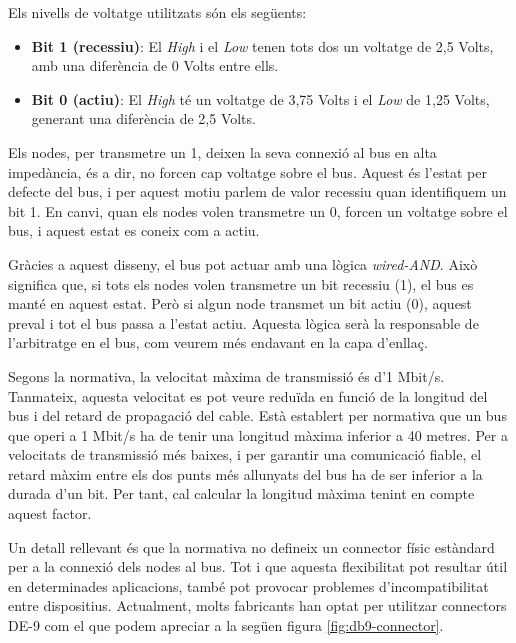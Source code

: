 \documentclass{tfgitic}[2024/07/01]
\begin{document}
Els nivells de voltatge utilitzats són els següents:

\begin{itemize}
  \item \textbf{Bit 1 (recessiu)}: El  \textit{High} i el  \textit{Low} tenen tots dos un voltatge de 2,5 Volts, amb una diferència de 0 Volts entre ells.

  \item \textbf{Bit 0 (actiu)}: El  \textit{High} té un voltatge de 3,75 Volts i el  \textit{Low} de 1,25 Volts, generant una diferència de 2,5 Volts.
\end{itemize} 

Els nodes, per transmetre un 1, deixen la seva connexió al bus en alta impedància, és a dir, no forcen cap voltatge sobre el bus. Aquest és l'estat per defecte del bus, 
i per aquest motiu parlem de valor recessiu quan identifiquem un bit 1. En canvi, quan els nodes volen transmetre un 0, forcen un voltatge sobre el bus, i aquest estat es 
coneix com a actiu.

Gràcies a aquest disseny, el bus pot actuar amb una lògica \textit{wired-AND}. Això significa que, si tots els nodes volen transmetre un bit recessiu (1), el bus es manté en aquest 
estat. Però si algun node transmet un bit actiu (0), aquest preval i tot el bus passa a l'estat actiu. Aquesta lògica serà la responsable de l'arbitratge en el bus, com veurem 
més endavant en la capa d'enllaç.

Segons la normativa, la velocitat màxima de transmissió és d'1 Mbit/s. Tanmateix, aquesta velocitat es pot veure reduïda en funció de la longitud del bus i del retard de 
propagació del cable. Està establert per normativa que un bus que operi a 1 Mbit/s ha de tenir una longitud màxima inferior a 40 metres. Per a velocitats de transmissió 
més baixes, i per garantir una comunicació fiable, el retard màxim entre els dos punts més allunyats del bus ha de ser inferior a la durada d'un bit. Per tant, cal calcular 
la longitud màxima tenint en compte aquest factor.

Un detall rellevant és que la normativa no defineix un connector físic estàndard per a la connexió dels nodes al bus. Tot i que aquesta flexibilitat pot resultar útil en 
determinades aplicacions, també pot provocar problemes d'incompatibilitat entre dispositius. Actualment, molts fabricants han optat per utilitzar connectors DE-9
com el que podem apreciar a la següen figura \ref{fig:db9-connector}.
\end{document}
